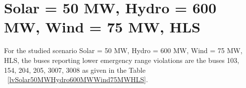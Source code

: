 \documentclass[10pt]{report}
\begin{document}
\section{Solar = 50 MW, Hydro = 600 MW, Wind = 75 MW, HLS}
For the studied scenario Solar = 50 MW, Hydro = 600 MW, Wind = 75 MW, HLS, the buses reporting lower emergency range violations are the buses 103, 154, 204, 205, 3007, 3008 as given in the Table ~\ref{lvSolar50MWHydro600MWWind75MWHLS}.
\begin{table}[H]
\caption{Contingencies reporting bus voltages lower than emergency voltage of 1.1 PU for scenario Solar = 50 MW, Hydro = 600 MW, Wind = 75 MW, HLS}
\label{lvSolar50MWHydro600MWWind75MWHLS}
\centering
{}
\end{table}
\end{document}
